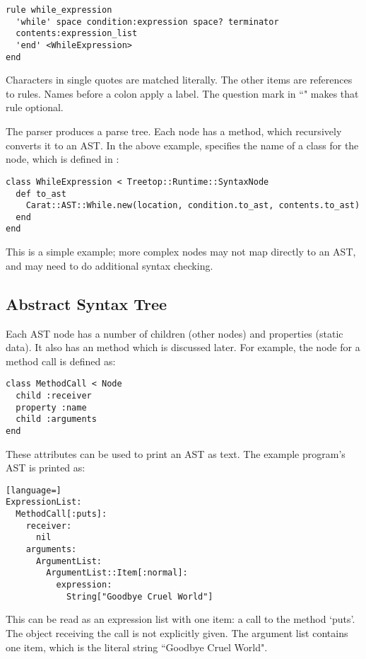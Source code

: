 \begin{lstlisting}[language=treetop]
rule while_expression
  'while' space condition:expression space? terminator
  contents:expression_list
  'end' <WhileExpression>
end
\end{lstlisting}

Characters in single quotes are matched literally. The other items are references to rules. Names before a colon apply a label. The question mark in ``" makes that rule optional.

The parser produces a parse tree. Each node has a  method, which recursively converts it to an AST. In the above example,  specifies the name of a class for the node, which is defined in :

\begin{lstlisting}
class WhileExpression < Treetop::Runtime::SyntaxNode
  def to_ast
    Carat::AST::While.new(location, condition.to_ast, contents.to_ast)
  end
end
\end{lstlisting}

This is a simple example; more complex nodes may not map directly to an AST, and may need to do additional syntax checking.

\subsection{Abstract Syntax Tree}

Each AST node has a number of children (other nodes) and properties (static data). It also has an  method which is discussed later. For example, the node for a method call is defined as:

\begin{lstlisting}
class MethodCall < Node
  child :receiver
  property :name
  child :arguments
end
\end{lstlisting}

These attributes can be used to print an AST as text. The example program's AST is printed as:

\begin{lstlisting}[language=]
ExpressionList:
  MethodCall[:puts]:
    receiver:
      nil
    arguments:
      ArgumentList:
        ArgumentList::Item[:normal]:
          expression:
            String["Goodbye Cruel World"]
\end{lstlisting}

This can be read as an expression list with one item: a call to the method `puts'. The object receiving the call is not explicitly given. The argument list contains one item, which is the literal string ``Goodbye Cruel World".

